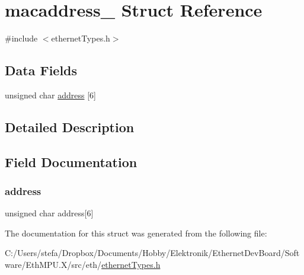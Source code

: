 \hypertarget{structmacaddress__}{}\section{macaddress\+\_\+ Struct Reference}
\label{structmacaddress__}


{\ttfamily \#include $<$ethernet\+Types.\+h$>$}

\subsection*{Data Fields}
\begin{DoxyCompactItemize}
\item 
unsigned char \mbox{\hyperlink{structmacaddress___aa70c068e41ae99fa44d0b66209237075}{address}} \mbox{[}6\mbox{]}
\end{DoxyCompactItemize}


\subsection{Detailed Description}


\subsection{Field Documentation}
\mbox{\label{structmacaddress___aa70c068e41ae99fa44d0b66209237075}} 
\subsubsection{\texorpdfstring{address}{address}}
{\footnotesize\ttfamily unsigned char address\mbox{[}6\mbox{]}}



The documentation for this struct was generated from the following file\+:\begin{DoxyCompactItemize}
\item 
C\+:/\+Users/stefa/\+Dropbox/\+Documents/\+Hobby/\+Elektronik/\+Ethernet\+Dev\+Board/\+Software/\+Eth\+M\+P\+U.\+X/src/eth/\mbox{\hyperlink{ethernet_types_8h}{ethernet\+Types.\+h}}\end{DoxyCompactItemize}
